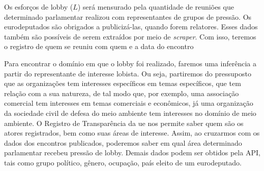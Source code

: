Os esforços de lobby ($L$) será mensurado pela quantidade de reuniões que determinado parlamentar realizou com representantes de grupos de pressão. Os eurodeputados são obrigados a publicizá-las, quando forem relatores. Esses dados também são possíveis de serem extraídos por meio de \textit{scraper}. Com isso, teremos o registro de quem se reuniu com quem e a data do encontro%

Para encontrar o domínio em que o lobby foi realizado, faremos uma inferência a partir do representante de interesse lobista. Ou seja, partiremos do pressuposto que as organizações tem interesses específicos em temas específicos, que tem relação com a sua natureza, de tal modo que, por exemplo, uma associação comercial tem interesses em temas comerciais e econômicos, já uma organização da sociedade civil de defesa do meio ambiente tem interesses no domínio de meio ambiente. O Registro de Transparência da \acrshort{ue} nos permite saber quem são os atores registrados, bem como suas áreas de interesse. Assim, ao cruzarmos com os dados dos encontros publicados, poderemos saber em qual área determinado parlamentar recebeu pressão de lobby. Demais dados podem ser obtidos pela API, tais como grupo político, gênero, ocupação, país eleito de um eurodeputado. 




